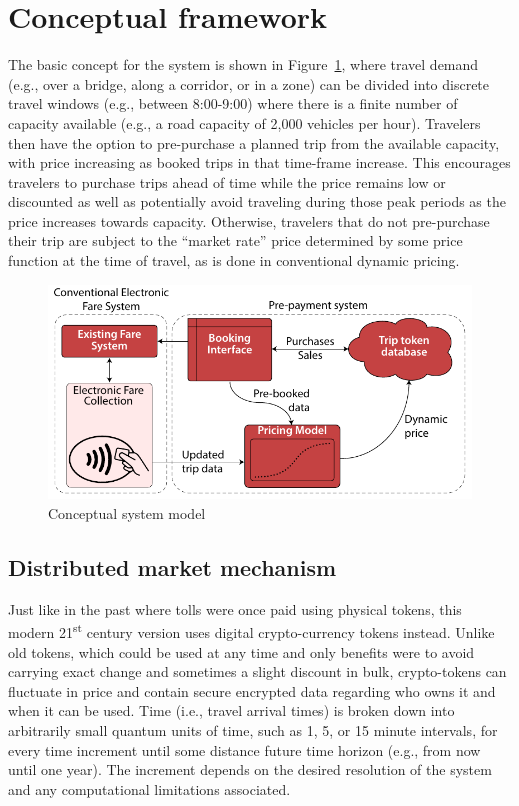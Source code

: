 \documentclass{article}
\begin{document}

\section{Conceptual framework}
The basic concept for the system is shown in Figure~\ref{fig:systemmodel}, where travel demand (e.g., over a bridge, along a corridor, or in a zone) can be divided into discrete travel windows (e.g., between 8:00-9:00) where there is a finite number of capacity available (e.g., a road capacity of 2,000 vehicles per hour). Travelers then have the option to pre-purchase a planned trip from the available capacity, with price increasing as booked trips in that time-frame increase. This encourages travelers to purchase trips ahead of time while the price remains low or discounted as well as potentially avoid traveling during those peak periods as the price increases towards capacity. Otherwise, travelers that do not pre-purchase their trip are subject to the ``market rate'' price determined by some price function at the time of travel, as is done in conventional dynamic pricing.

\begin{figure}[h]
	\includegraphics[width=0.75\linewidth]{figures/systemmodel}
	\centering
	\caption{Conceptual system model}
	\label{fig:systemmodel}
\end{figure}

\subsection{Distributed market mechanism}
Just like in the past where tolls were once paid using physical tokens, this modern 21\textsuperscript{st} century version uses digital crypto-currency tokens instead. Unlike old tokens, which could be used at any time and only benefits were to avoid carrying exact change and sometimes a slight discount in bulk, crypto-tokens can fluctuate in price and contain secure encrypted data regarding who owns it and when it can be used. Time (i.e., travel arrival times) is broken down into arbitrarily small quantum units of time, such as 1, 5, or 15 minute intervals, for every time increment until some distance future time horizon (e.g., from now until one year). The increment depends on the desired resolution of the system and any computational limitations associated. 
\end{document}
